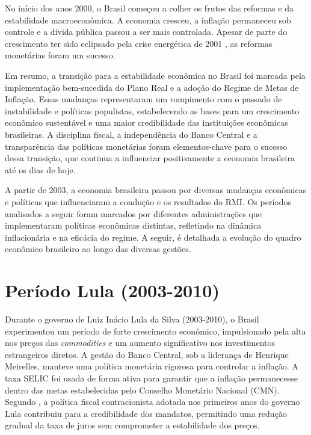 \documentclass[12pt,oneside,a4paper,chapter=TITLE,english,brazil,sumario=abnt-6027-2012]{abntex2}
\begin{document}
No início dos anos 2000, o Brasil começou a colher os frutos das reformas e da estabilidade macroeconômica. A economia cresceu, a inflação permaneceu sob controle e a dívida pública passou a ser mais controlada. Apesar de parte do crescimento ter sido eclipsado pela crise energética de 2001 \cite{fabiogiambiagi_2016_economia}, as reformas monetárias foram um sucesso.

Em resumo, a transição para a estabilidade econômica no Brasil foi marcada pela implementação bem-sucedida do Plano Real e a adoção do Regime de Metas de Inflação. Essas mudanças representaram um rompimento com o passado de instabilidade e políticas populistas, estabelecendo as bases para um crescimento econômico sustentável e uma maior credibilidade das instituições econômicas brasileiras. A disciplina fiscal, a independência do Banco Central e a transparência das políticas monetárias foram elementos-chave para o sucesso dessa transição, que continua a influenciar positivamente a economia brasileira até os dias de hoje.

A partir de 2003, a economia brasileira passou por diversas mudanças econômicas e políticas que influenciaram a condução e os resultados do RMI. Os períodos analisados a seguir foram marcados por diferentes administrações que implementaram políticas econômicas distintas, refletindo na dinâmica inflacionária e na eficácia do regime. A seguir, é detalhada a evolução do quadro econômico brasileiro ao longo das diversas gestões.

\section{Período Lula (2003-2010)}

Durante o governo de Luiz Inácio Lula da Silva (2003-2010), o Brasil experimentou um período de forte crescimento econômico, impulsionado pela alta nos preços das \textit{commodities} e um aumento significativo nos investimentos estrangeiros diretos. A gestão do Banco Central, sob a liderança de Henrique Meirelles, manteve uma política monetária rigorosa para controlar a inflação. A taxa SELIC foi usada de forma ativa para garantir que a inflação permanecesse dentro das metas estabelecidas pelo Conselho Monetário Nacional (CMN). Segundo , a política fiscal contracionista adotada nos primeiros anos do governo Lula contribuiu para a credibilidade dos mandatos, permitindo uma redução gradual da taxa de juros sem comprometer a estabilidade dos preços.
\end{document}

